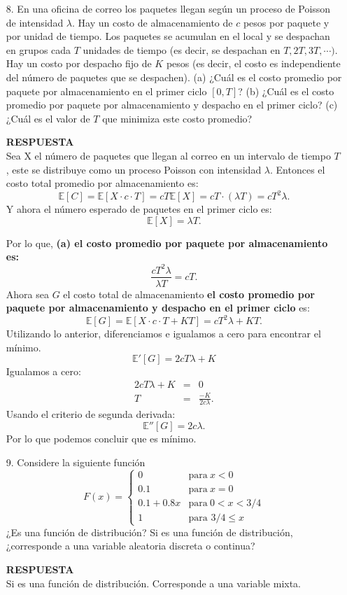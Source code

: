 \documentclass[11pt,letterpaper]{article}
\newcommand{\mE}{\mathbb{E}}
\newcommand{\res}{\textbf{RESPUESTA}\\}
\begin{document}
\begin{itemize}
\item[8.] En una oficina de correo los paquetes llegan según un proceso de Poisson de intensidad $\lambda$. Hay un costo de almacenamiento de $c$ pesos por paquete y por unidad de tiempo. Los paquetes se acumulan en el local y se despachan en grupos cada $T$ unidades de tiempo (es decir, se despachan en $T , 2T , 3T , \cdots)$. Hay un costo por despacho fijo de $K$ pesos (es decir, el costo es independiente del número de paquetes que se despachen). (a) ¿Cuál es el costo promedio por paquete por almacenamiento en el primer ciclo $[0, T ]$? (b) ¿Cuál es el costo promedio por paquete por almacenamiento y despacho en el primer ciclo? (c) ¿Cuál es el valor de $T$ que minimiza este costo promedio?

\res 
Sea X el número de paquetes que llegan al correo en un intervalo de tiempo $T$, este se distribuye como un proceso Poisson con intensidad $\lambda$. Entonces el costo total promedio por almacenamiento es: 
$$\mE[C]=\mE[X\cdot c \cdot T]=cT\mE[X]=cT\cdot (\lambda T)=cT^2\lambda.$$
Y ahora el número esperado de paquetes en el primer ciclo es: 
$$\mE[X]=\lambda T.$$

Por lo que, \textbf{(a) el costo promedio por paquete por almacenamiento es:}
$$\frac{cT^2\lambda}{\lambda T}=cT.$$
Ahora sea $G$ el costo total de almacenamiento \textbf{el costo promedio por paquete por almacenamiento y despacho en el primer ciclo} es:
$$\mE[G]=\mE[X\cdot c \cdot T + KT]=cT^2\lambda+KT.$$
Utilizando lo anterior, diferenciamos e igualamos a cero para encontrar el mínimo.
$$\mE'[G]=2cT\lambda+K$$
 Igualamos a cero:
\begin{equation*}
\begin{array}{ccc}
2cT\lambda+K &=& 0\\
T&=&\frac{-K}{2c\lambda}.
\end{array}
\end{equation*}
Usando el criterio de segunda derivada:
$$\mE''[G]=2c\lambda.$$
Por lo que podemos concluir que es mínimo.
\item[9.] Considere la siguiente función
\begin{equation*}
F(x)=\left\{ \begin{array}{cl}
0 & \text{para} \ x<0\\
0.1 & \text{para} \ x=0\\
0.1+0.8x & \text{para} \ 0<x<3/4\\
1 & \text{para } 3/4\leq x
\end{array} \right.
\end{equation*}
¿Es una función de distribución? Si es una función de distribución, ¿corresponde a una variable
aleatoria discreta o continua?

\res 
Si es una función de distribución. Corresponde a una variable mixta.
\end{itemize}
\end{document}
